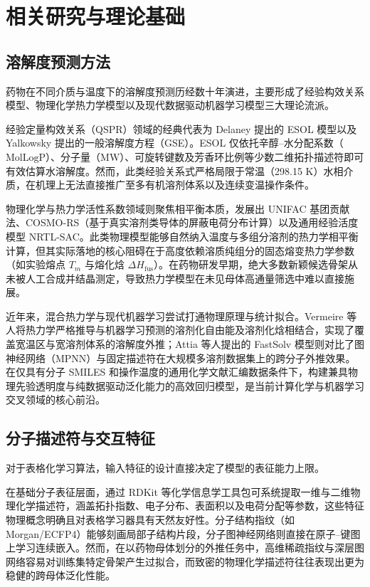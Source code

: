 \section{相关研究与理论基础}

\subsection{溶解度预测方法}

药物在不同介质与温度下的溶解度预测历经数十年演进，主要形成了经验构效关系模型、物理化学热力学模型以及现代数据驱动机器学习模型三大理论流派。

经验定量构效关系（QSPR）领域的经典代表为 Delaney 提出的 ESOL 模型\cite{delaney2004}以及 Yalkowsky 提出的一般溶解度方程（GSE）。ESOL 仅依托辛醇--水分配系数（$\mathrm{MolLogP}$）、分子量（$\mathrm{MW}$）、可旋转键数及芳香环比例等少数二维拓扑描述符即可有效估算水溶解度。然而，此类经验关系式严格局限于常温（298.15 K）水相介质，在机理上无法直接推广至多有机溶剂体系以及连续变温操作条件。

物理化学与热力学活性系数领域则聚焦相平衡本质，发展出 UNIFAC 基团贡献法、COSMO-RS（基于真实溶剂类导体的屏蔽电荷分布计算）以及通用经验活度模型 NRTL-SAC。此类物理模型能够自然纳入温度与多组分溶剂的热力学相平衡计算，但其实际落地的核心阻碍在于高度依赖溶质纯组分的固态熔变热力学参数（如实验熔点 $T_m$ 与熔化焓 $\Delta H_{\mathrm{fus}}$）。在药物研发早期，绝大多数新颖候选骨架从未被人工合成并结晶测定，导致热力学模型在未见母体高通量筛选中难以直接施展。

近年来，混合热力学与现代机器学习尝试打通物理原理与统计拟合。Vermeire 等人将热力学严格推导与机器学习预测的溶剂化自由能及溶剂化焓相结合，实现了覆盖宽温区与宽溶剂体系的溶解度外推\cite{vermeire2022}；Attia 等人提出的 FastSolv 模型则对比了图神经网络（MPNN）与固定描述符在大规模多溶剂数据集上的跨分子外推效果\cite{fastsolv2025}。在仅具有分子 SMILES 和操作温度的通用化学文献汇编数据条件下，构建兼具物理先验透明度与纯数据驱动泛化能力的高效回归模型，是当前计算化学与机器学习交叉领域的核心前沿。

\subsection{分子描述符与交互特征}

对于表格化学习算法，输入特征的设计直接决定了模型的表征能力上限。

在基础分子表征层面，通过 RDKit 等化学信息学工具包可系统提取一维与二维物理化学描述符，涵盖拓扑指数、电子分布、表面积以及电荷分配等参数，这些特征物理概念明确且对表格学习器具有天然友好性。分子结构指纹（如 Morgan/ECFP4）能够刻画局部子结构片段\cite{ye2021}，分子图神经网络则直接在原子--键图上学习连续嵌入\cite{fastsolv2025}。然而，在以药物母体划分的外推任务中，高维稀疏指纹与深层图网络容易对训练集特定骨架产生过拟合，而致密的物理化学描述符往往表现出更为稳健的跨母体泛化性能。

